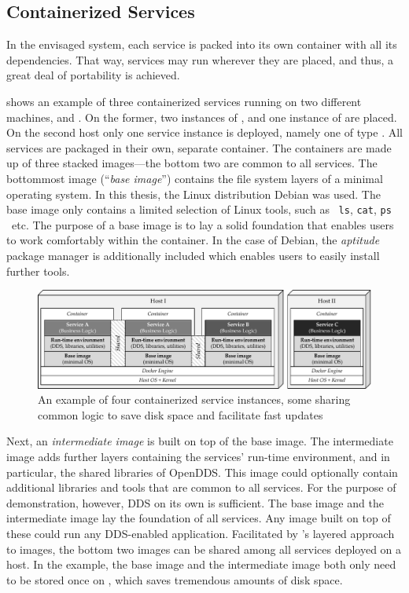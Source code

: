 %
%
%
%
%
%
%
%
%
%
%
\subsection{Containerized Services} \label{sec:containerized-services}
In the envisaged system, each service is packed into its own container with all its dependencies. That way, services may run wherever they are placed, and thus, a great deal of portability is achieved.

 shows an example of three containerized services running on two different machines,  and . On the former, two instances of , and one instance of  are placed. On the second host only one service instance is deployed, namely one of type . All services are packaged in their own, separate container. The containers are made up of three stacked images---the bottom two are common to all services. The bottommost image (``\emph{base image}'') contains the file system layers of a minimal operating system. In this thesis, the Linux distribution Debian was used. The base image only contains a limited selection of Linux tools, such as \ \texttt{ls}, \texttt{cat}, \texttt{ps} \ etc. The purpose of a base image is to lay a solid foundation that enables users to work comfortably within the container. In the case of Debian, the \emph{aptitude} package manager is additionally included which enables users to easily install further tools.

\begin{figure}[htpb]
  \centering
  \includegraphics[width=\textwidth]{figures/docker-sharing}
  \caption[An example of containerized services]{An example of four containerized service instances, some sharing common logic to save disk space and facilitate fast updates}\label{fig:service-containers}
\end{figure}

Next, an \emph{intermediate image} is built on top of the base image. The intermediate image adds further layers containing the services' run-time environment, and in particular, the shared libraries of OpenDDS. This image could optionally contain additional libraries and tools that are common to all services. For the purpose of demonstration, however, DDS on its own is sufficient. The base image and the intermediate image lay the foundation of all services. Any image built on top of these could run any DDS-enabled application. Facilitated by \docker 's layered approach to images, the bottom two images can be shared among all services deployed on a host. In the example, the base image and the intermediate image both only need to be stored once on , which saves tremendous amounts of disk space.

